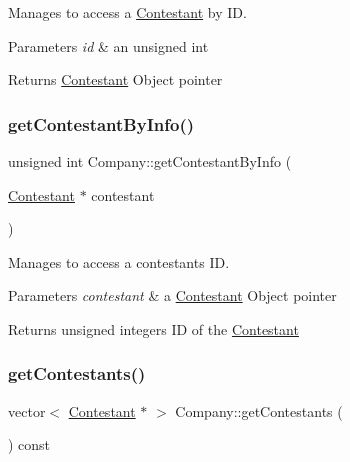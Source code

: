 Manages to access a \hyperlink{class_contestant}{Contestant} by ID. 


\begin{DoxyParams}{Parameters}
{\em id} & an unsigned int \\
\hline
\end{DoxyParams}
\begin{DoxyReturn}{Returns}
\hyperlink{class_contestant}{Contestant} Object pointer 
\end{DoxyReturn}
\mbox{\label{class_company_ae6e1537b2cd2c2d8c4906f67dfbb80ca}} 
\subsubsection{\texorpdfstring{get\+Contestant\+By\+Info()}{getContestantByInfo()}}
{\footnotesize\ttfamily unsigned int Company\+::get\+Contestant\+By\+Info (\begin{DoxyParamCaption}\item[{\hyperlink{class_contestant}{Contestant} $\ast$}]{contestant }\end{DoxyParamCaption})}



Manages to access a contestant\textquotesingle{}s ID. 


\begin{DoxyParams}{Parameters}
{\em contestant} & a \hyperlink{class_contestant}{Contestant} Object pointer \\
\hline
\end{DoxyParams}
\begin{DoxyReturn}{Returns}
unsigned integer\textquotesingle{}s ID of the \hyperlink{class_contestant}{Contestant} 
\end{DoxyReturn}
\mbox{\label{class_company_a3e0b5c137e22060961b27332396384ca}} 
\subsubsection{\texorpdfstring{get\+Contestants()}{getContestants()}}
{\footnotesize\ttfamily vector$<$ \hyperlink{class_contestant}{Contestant} $\ast$ $>$ Company\+::get\+Contestants (\begin{DoxyParamCaption}{ }\end{DoxyParamCaption}) const}



